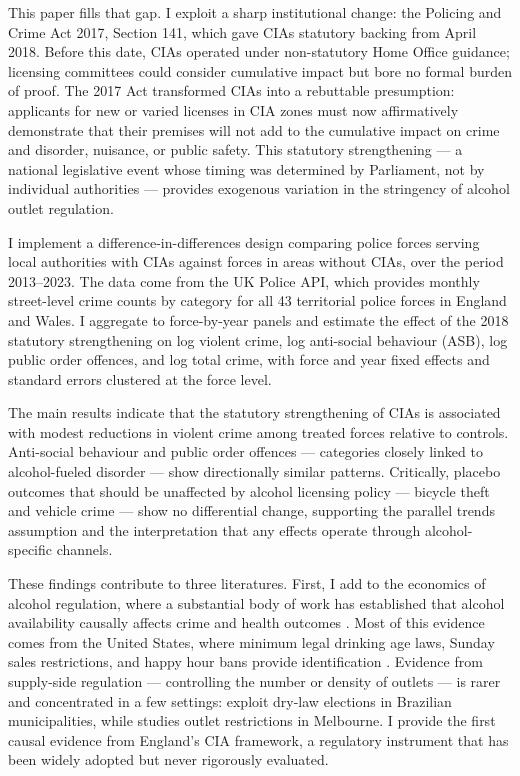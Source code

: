 \documentclass[12pt]{article}
\begin{document}
This paper fills that gap. I exploit a sharp institutional change: the Policing and Crime Act 2017, Section 141, which gave CIAs statutory backing from April 2018. Before this date, CIAs operated under non-statutory Home Office guidance; licensing committees could consider cumulative impact but bore no formal burden of proof. The 2017 Act transformed CIAs into a rebuttable presumption: applicants for new or varied licenses in CIA zones must now affirmatively demonstrate that their premises will not add to the cumulative impact on crime and disorder, nuisance, or public safety. This statutory strengthening --- a national legislative event whose timing was determined by Parliament, not by individual authorities --- provides exogenous variation in the stringency of alcohol outlet regulation.

I implement a difference-in-differences design comparing police forces serving local authorities with CIAs against forces in areas without CIAs, over the period 2013--2023. The data come from the UK Police API, which provides monthly street-level crime counts by category for all 43 territorial police forces in England and Wales. I aggregate to force-by-year panels and estimate the effect of the 2018 statutory strengthening on log violent crime, log anti-social behaviour (ASB), log public order offences, and log total crime, with force and year fixed effects and standard errors clustered at the force level.

The main results indicate that the statutory strengthening of CIAs is associated with modest reductions in violent crime among treated forces relative to controls. Anti-social behaviour and public order offences --- categories closely linked to alcohol-fueled disorder --- show directionally similar patterns. Critically, placebo outcomes that should be unaffected by alcohol licensing policy --- bicycle theft and vehicle crime --- show no differential change, supporting the parallel trends assumption and the interpretation that any effects operate through alcohol-specific channels.

These findings contribute to three literatures. First, I add to the economics of alcohol regulation, where a substantial body of work has established that alcohol availability causally affects crime and health outcomes \citep{carpenter2009effect, anderson2018minimum, heaton2012sunday}. Most of this evidence comes from the United States, where minimum legal drinking age laws, Sunday sales restrictions, and happy hour bans provide identification \citep{markowitz2005alcohol, lovenheim2010effect}. Evidence from supply-side regulation --- controlling the number or density of outlets --- is rarer and concentrated in a few settings: \citet{biderman2010dry} exploit dry-law elections in Brazilian municipalities, while \citet{livingston2011alcohol} studies outlet restrictions in Melbourne. I provide the first causal evidence from England's CIA framework, a regulatory instrument that has been widely adopted but never rigorously evaluated.
\end{document}
